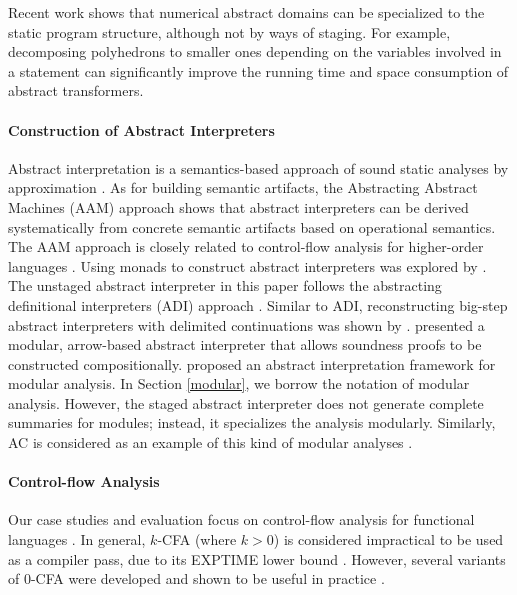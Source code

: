 Recent work shows that numerical abstract domains can be
specialized to the static program structure, although not by
ways of staging. For example, decomposing polyhedrons
\cite{DBLP:conf/popl/SinghPV17, Singh:2017:PCD:3177123.3158143} to
smaller ones depending on the variables involved in a statement can
significantly improve the running time and space consumption of abstract
transformers.

\paragraph{Construction of Abstract Interpreters} Abstract interpretation is a
semantics-based approach of sound static analyses by approximation
\cite{DBLP:conf/popl/CousotC77, Cousot98-5}.
As for building semantic artifacts, the Abstracting Abstract Machines (AAM)
\cite{DBLP:journals/jfp/HornM12, DBLP:conf/icfp/HornM10} approach shows that
abstract interpreters can be derived systematically from concrete semantic
artifacts based on operational semantics.
The AAM approach is closely related to control-flow analysis for higher-order languages
\cite{Midtgaard:2012:CAF:2187671.2187672, Shivers:1991:SSC:115865.115884}.
Using monads to construct abstract interpreters was explored by
\citet{Sergey:2013:MAI:2491956.2491979, DBLP:journals/pacmpl/DaraisLNH17,
Darais:2015:GTM:2814270.2814308}.
The unstaged abstract interpreter in this paper follows the abstracting
definitional interpreters (ADI) approach \cite{DBLP:journals/pacmpl/DaraisLNH17}.  
Similar to ADI, reconstructing
big-step abstract interpreters with delimited continuations was shown by
\citet{Wei:2018:RAA:3243631.3236800}.
\citet{Keidel:2018:CSP:3243631.3236767}
presented a modular, arrow-based abstract interpreter that allows soundness
proofs to be constructed compositionally.  \citet{DBLP:conf/cc/CousotC02}
proposed an abstract interpretation framework for modular analysis. In Section
\ref{modular}, we borrow the notation of modular analysis.  However, the staged
abstract interpreter does not generate complete summaries for modules; instead,
it specializes the analysis modularly. Similarly, AC is considered as an
example of this kind of modular analyses \cite{DBLP:conf/cc/CousotC02}.

\paragraph{Control-flow Analysis} Our case studies and evaluation focus on
control-flow analysis for functional languages
\cite{Shivers:1991:SSC:115865.115884, Midtgaard:2012:CAF:2187671.2187672}. In
general, $k$-CFA (where $k > 0$) is considered impractical to be used as a
compiler pass, due to its EXPTIME lower bound
\cite{VanHorn:2008:DKC:1411204.1411243}.  However, several variants of 0-CFA
were developed and shown to be useful in practice
\cite{Adams:2011:FTR:2048066.2048105, Bergstrom:2014:PEH:2628136.2628153,
ashley:practical, Reppy:2006:TCA:1159876.1159888}.

